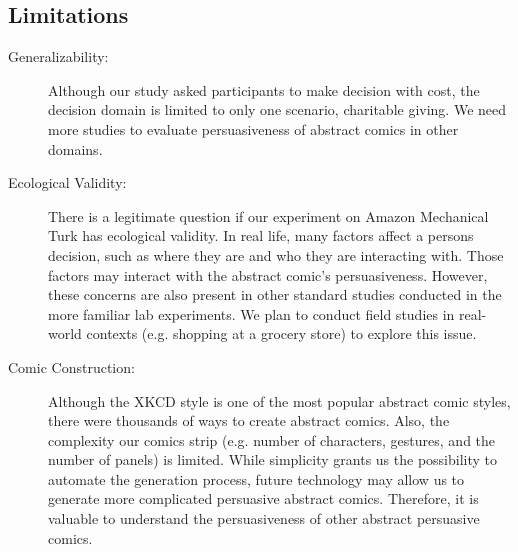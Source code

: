 \subsection{Limitations}
\begin{description}
 \item[Generalizability:]  Although our study asked participants to make decision with cost, the decision domain is limited to only one scenario, charitable giving. We need more studies to evaluate persuasiveness of abstract comics in other domains.

 \item[Ecological Validity:] There is a legitimate question if our experiment on Amazon Mechanical Turk has ecological validity.  In real life, many factors  affect a persons decision, such as where they are and who they are interacting with. Those factors may interact with the abstract comic's persuasiveness. However, these concerns are also present in other standard studies conducted in the more familiar lab experiments. We plan to conduct field studies in real-world contexts (e.g. shopping at a grocery store) to explore this issue.
  
 \item[Comic Construction:] Although the XKCD style is one of the most popular abstract comic styles, there were thousands of ways to create abstract comics. Also, the complexity our comics strip (e.g. number of characters, gestures, and the number of panels) is limited. While simplicity grants us the possibility to automate the generation process, future technology may allow us to generate more complicated persuasive abstract comics. Therefore, it is valuable to understand the persuasiveness of other abstract persuasive comics.
\end{description}

